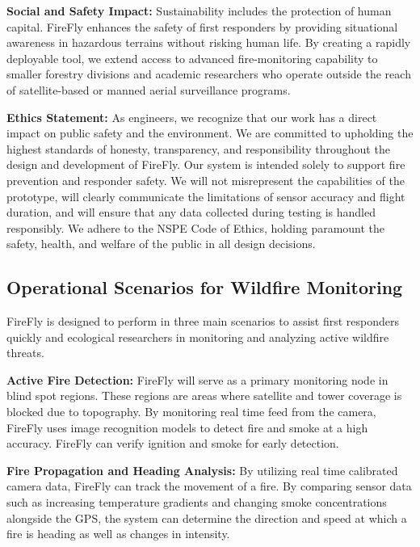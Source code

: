 \documentclass[journal, onecolumn]{IEEEtran}
\begin{document}
\vspace{1em}

\textbf{Social and Safety Impact:}
Sustainability includes the protection of human capital. FireFly enhances the safety of first responders by providing situational awareness in hazardous terrains without risking human life. By creating a rapidly deployable tool, we extend access to advanced fire-monitoring capability to smaller forestry divisions and academic researchers who operate outside the reach of satellite-based or manned aerial surveillance programs.

\vspace{1em}

\textbf{Ethics Statement:}
As engineers, we recognize that our work has a direct impact on public safety and the environment. We are committed to upholding the highest standards of honesty, transparency, and responsibility throughout the design and development of FireFly. Our system is intended solely to support fire prevention and responder safety. We will not misrepresent the capabilities of the prototype, will clearly communicate the limitations of sensor accuracy and flight duration, and will ensure that any data collected during testing is handled responsibly. We adhere to the NSPE Code of Ethics, holding paramount the safety, health, and welfare of the public in all design decisions.

\subsection{Operational Scenarios for Wildfire Monitoring}
FireFly is designed to perform in three main scenarios to assist first responders quickly and ecological researchers in monitoring and analyzing active wildfire threats.

\vspace{1em}

\textbf{Active Fire Detection:}
FireFly will serve as a primary monitoring node in blind spot regions. These regions are areas where satellite and tower coverage is blocked due to topography. By monitoring real time feed from the camera, FireFly uses image recognition models to detect fire and smoke at a high accuracy. FireFly can verify ignition and smoke for early detection.

\vspace{1em}

\textbf{Fire Propagation and Heading Analysis:}
By utilizing real time calibrated camera data, FireFly can track the movement of a fire. By comparing sensor data such as increasing temperature gradients and changing smoke concentrations alongside the GPS, the system can determine the direction and speed at which a fire is heading as well as changes in intensity.
\end{document}
